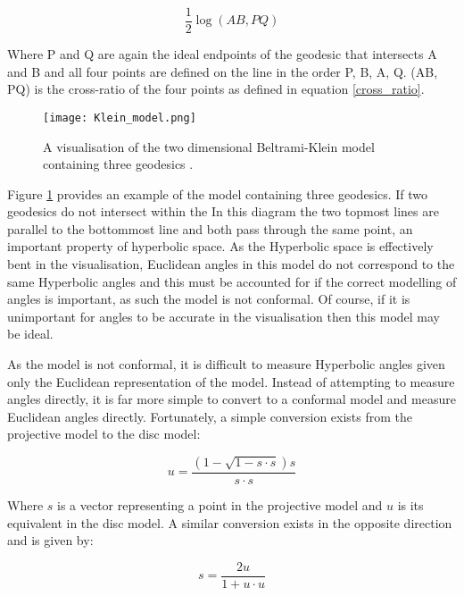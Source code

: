\begin{equation}
\label{distance_disc_model}
\frac{1}{2}\log(AB,PQ)
\end{equation}

Where P and Q are again the ideal endpoints of the geodesic that intersects A and B and all four points are defined on the line in the order P, B, A, Q. (AB, PQ) is the cross-ratio of the four points as defined in equation \ref{cross_ratio}.

\begin{figure}
	\centering
	\texttt{[image: Klein\_model.png]}
	\caption[A visualisation of the two dimensional Beltrami-Klein model containing three geodesics]{A visualisation of the two dimensional Beltrami-Klein model containing three geodesics .}
	\label{fig:klein_example}
\end{figure}

Figure \ref{fig:klein_example} provides an example of the model containing three geodesics. If two geodesics do not intersect within the  In this diagram the two topmost lines are parallel to the bottommost line and both pass through the same point, an important property of hyperbolic space. As the Hyperbolic space is effectively bent in the visualisation, Euclidean angles in this model do not correspond to the same Hyperbolic angles and this must be accounted for if the correct modelling of angles is important, as such the model is not conformal. Of course, if it is unimportant for angles to be accurate in the visualisation then this model may be ideal.

As the model is not conformal, it is difficult to measure Hyperbolic angles given only the Euclidean representation of the model. Instead of attempting to measure angles directly, it is far more simple to convert to a conformal model and measure Euclidean angles directly. Fortunately, a simple conversion exists from the projective model to the disc model:

\begin{equation}
\label{projective_to_disc}
u=\frac{(1-\sqrt{1-s\cdot{}s})s}{s\cdot{}s}
\end{equation}

Where $s$ is a vector representing a point in the projective model and $u$ is its equivalent in the disc model. A similar conversion exists in the opposite direction and is given by:

\begin{equation}
\label{disc_to_projective}
s=\frac{2u}{1+u\cdot{}u}
\end{equation}


